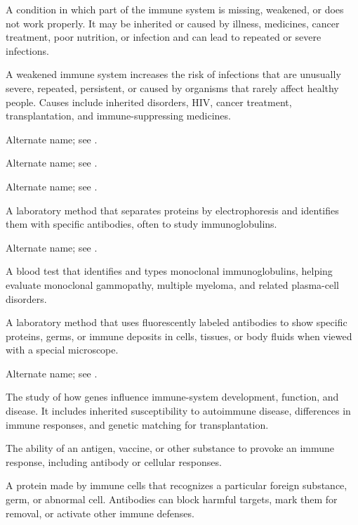  A condition in which part of the immune system is missing, weakened, or does not work properly. It may be inherited or caused by illness, medicines, cancer treatment, poor nutrition, or infection and can lead to repeated or severe infections.

 A weakened immune system increases the risk of infections that are unusually severe, repeated, persistent, or caused by organisms that rarely affect healthy people. Causes include inherited disorders, HIV, cancer treatment, transplantation, and immune-suppressing medicines.

 Alternate name; see .

 Alternate name; see .

 Alternate name; see .

 A laboratory method that separates proteins by electrophoresis and identifies them with specific antibodies, often to study immunoglobulins.

 Alternate name; see .

 A blood test that identifies and types monoclonal immunoglobulins, helping evaluate monoclonal gammopathy, multiple myeloma, and related plasma-cell disorders.

 A laboratory method that uses fluorescently labeled antibodies to show specific proteins, germs, or immune deposits in cells, tissues, or body fluids when viewed with a special microscope.

 Alternate name; see .

 The study of how genes influence immune-system development, function, and disease. It includes inherited susceptibility to autoimmune disease, differences in immune responses, and genetic matching for transplantation.

 The ability of an antigen, vaccine, or other substance to provoke an immune response, including antibody or cellular responses.

 A protein made by immune cells that recognizes a particular foreign substance, germ, or abnormal cell. Antibodies can block harmful targets, mark them for removal, or activate other immune defenses.

